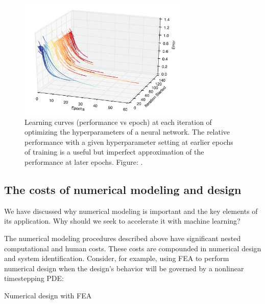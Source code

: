 \documentclass{puthesis}
\begin{document}
\begin{figure}[t]
\centering
\includegraphics[width=8cm,clip]{intro_figures/inner_loop_opt.pdf}
\caption{\small Learning curves (performance vs epoch) at each iteration of optimizing
the hyperparameters of a neural network. The relative performance with a given
hyperparameter setting at earlier epochs of training
is a useful but imperfect approximation of the performance
at later epochs. Figure: \citet{swersky2014freeze}.}%
\label{Fig:inner_loop_opt}%
\end{figure}

\subsection{The costs of numerical modeling and design}
We have discussed why numerical modeling is
important and the key elements of its application.
Why should we seek to accelerate it with machine learning?

The numerical modeling procedures described above have significant nested
computational and human costs.
These costs are compounded in numerical design and system identification.
Consider, for example, using FEA to perform numerical design when the
design's behavior will be governed by a nonlinear timestepping PDE:

\begin{algorithm}[H]
  \SetAlgoLined
  \caption{Numerical design with FEA}
\end{algorithm}
\end{document}
